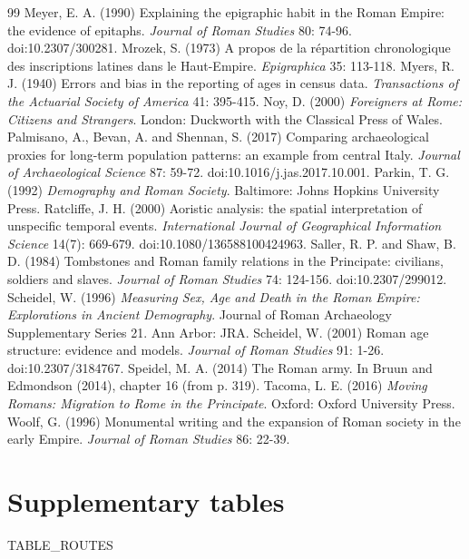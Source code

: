 \begin{thebibliography}{99}
 Meyer, E. A. (1990) Explaining the epigraphic habit in the Roman Empire: the evidence of epitaphs. \textit{Journal of Roman Studies} 80: 74-96. doi:10.2307/300281.
 Mrozek, S. (1973) A propos de la r{\'e}partition chronologique des inscriptions latines dans le Haut-Empire. \textit{Epigraphica} 35: 113-118.
 Myers, R. J. (1940) Errors and bias in the reporting of ages in census data. \textit{Transactions of the Actuarial Society of America} 41: 395-415.
 Noy, D. (2000) \textit{Foreigners at Rome: Citizens and Strangers}. London: Duckworth with the Classical Press of Wales.
 Palmisano, A., Bevan, A. and Shennan, S. (2017) Comparing archaeological proxies for long-term population patterns: an example from central Italy. \textit{Journal of Archaeological Science} 87: 59-72. doi:10.1016/j.jas.2017.10.001.
 Parkin, T. G. (1992) \textit{Demography and Roman Society}. Baltimore: Johns Hopkins University Press.
 Ratcliffe, J. H. (2000) Aoristic analysis: the spatial interpretation of unspecific temporal events. \textit{International Journal of Geographical Information Science} 14(7): 669-679. doi:10.1080/136588100424963.
 Saller, R. P. and Shaw, B. D. (1984) Tombstones and Roman family relations in the Principate: civilians, soldiers and slaves. \textit{Journal of Roman Studies} 74: 124-156. doi:10.2307/299012.
 Scheidel, W. (1996) \textit{Measuring Sex, Age and Death in the Roman Empire: Explorations in Ancient Demography}. Journal of Roman Archaeology Supplementary Series 21. Ann Arbor: JRA.
 Scheidel, W. (2001) Roman age structure: evidence and models. \textit{Journal of Roman Studies} 91: 1-26. doi:10.2307/3184767.
 Speidel, M. A. (2014) The Roman army. In Bruun and Edmondson (2014), chapter 16 (from p. 319).
 Tacoma, L. E. (2016) \textit{Moving Romans: Migration to Rome in the Principate}. Oxford: Oxford University Press.
 Woolf, G. (1996) Monumental writing and the expansion of Roman society in the early Empire. \textit{Journal of Roman Studies} 86: 22-39.
\end{thebibliography}

\appendix
\section{Supplementary tables}
{{TABLE_ROUTES}}

